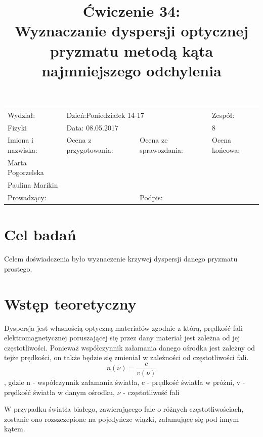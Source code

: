 \documentclass[a4paper,10pt]{article}
\def\arraystretch{1.2}
\begin{document}
\begin{table}
  \centering
  \def\arraystretch{1.5}
    \begin{tabular}{|l|l|l|l|} \hline
    Wydział:           & \multicolumn{2}{l|}{Dzień:Poniedziałek 14-17}    &Zespół:  \\
    Fizyki             &    \multicolumn{2}{l|}{Data: 08.05.2017}         &8             \\\hline
    Imiona i nazwiska: &Ocena z przygotowania:  &Ocena ze sprawozdania:   &Ocena końcowa: \\
    Marta Pogorzelska  &                        &                         &                \\
    Paulina Marikin    &                        &                         &\\\hline
    \multicolumn{2}{|l|}{Prowadzący:                 } &\multicolumn{2}{l|}{Podpis:             }  \\\hline
  \end{tabular}
\end{table}

\title{Ćwiczenie 34:\\Wyznaczanie dyspersji optycznej pryzmatu metodą kąta najmniejszego odchylenia}

\section{Cel badań}
Celem doświadczenia było wyznaczenie krzywej dyspersji danego pryzmatu prostego.

\section{Wstęp teoretyczny}
Dyspersja jest własnością optyczną materiałów zgodnie z którą, prędkość fali elektromagnetycznej poruszającej się przez dany materiał jest zależna od jej częstotliwości. Ponieważ współczynnik załamania danego ośrodka jest zależny od tejże prędkości, on także będzie się zmieniał w zależności od częstotliwości fali.
\begin{equation}
n(\nu) = \frac{c}{v(\nu)}
\end{equation}
, gdzie n - współczynnik załamania światła, c - prędkość światła w próżni, v - prędkość światła w danym ośrodku, $\nu$ - częstotliwość fali

W przypadku światła białego, zawierającego fale o różnych częstotliwościach, zostanie ono rozszczepione na pojedyńcze wiązki, załamujące się pod innym kątem.
\end{document}
